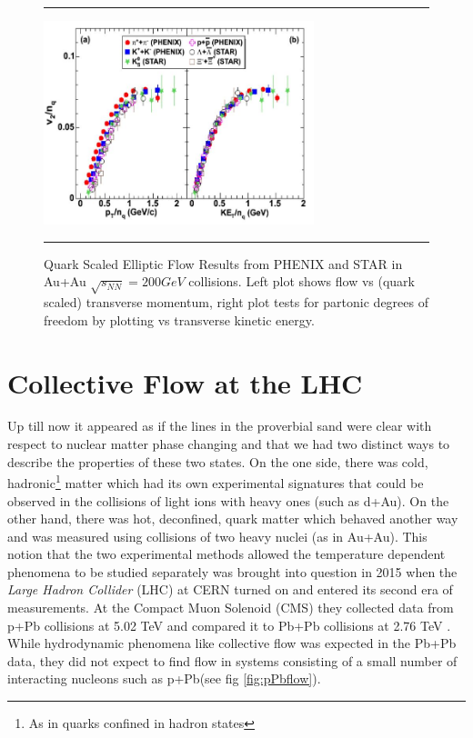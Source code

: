 \begin{figure}[htbp!]
  \centering    \rule{35em}{0.5pt}
    \includegraphics[width=0.7\textwidth]{prevplots/quarkscaledv2.JPG}

  \caption[Quark Scaled Elliptic Flow Results from PHENIX and STAR in Au+Au $\sqrt{s_NN}=200 GeV$ collisions]{Quark Scaled Elliptic Flow Results from PHENIX and STAR\citep{velkovska:lec12} in Au+Au $\sqrt{s_{NN}}=200 GeV$ collisions. Left plot shows flow vs (quark scaled) transverse momentum, right plot tests for partonic degrees of freedom by plotting vs transverse kinetic energy.}
  \label{fig:quarkscaledv2}    \rule{35em}{0.5pt}
\end{figure} 

\section{Collective Flow at the LHC}
Up till now it appeared as if the lines in the proverbial sand were clear with respect to nuclear matter phase changing and that we had two distinct ways to describe the properties of these two states. On the one side, there was cold, hadronic\footnote{As in quarks confined in hadron states} matter which had its own experimental signatures that could be observed in the collisions of light ions with heavy ones (such as d+Au). On the other hand, there was hot, deconfined, quark matter which behaved another way and was measured using collisions of two heavy nuclei (as in Au+Au). This notion that the two experimental methods allowed the temperature dependent phenomena to be studied separately was brought into question in 2015 when the \textit{Large Hadron Collider} (LHC) at CERN turned on and entered its second era of measurements. At the Compact Muon Solenoid (CMS) they collected data from p+Pb collisions at 5.02 TeV and compared it to Pb+Pb collisions at 2.76 TeV \citep{Khachatryan:2015waa}. While hydrodynamic phenomena like collective flow was expected in the Pb+Pb data, they did not expect to find flow in systems consisting of a small number of interacting nucleons such as p+Pb(see fig \ref{fig:pPbflow}).
 

